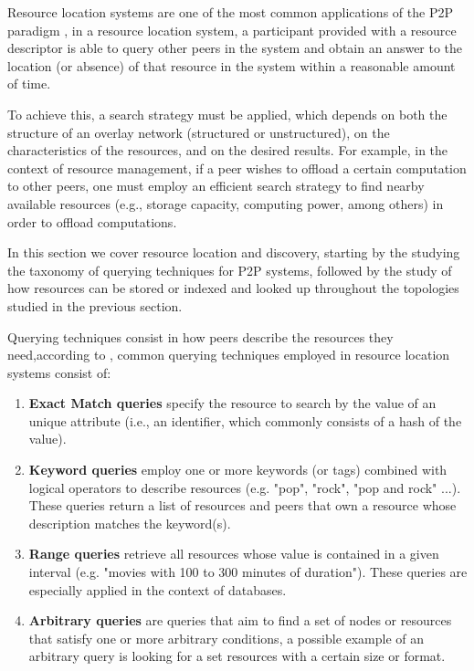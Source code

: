 

Resource location systems are one of the most common applications of the P2P paradigm \cite{leitaoPHDthesis}, in a resource location system, a participant provided with a resource descriptor is able to query other peers in the system and obtain an answer to the location (or absence) of that resource in the system within a reasonable amount of time.

To achieve this, a search strategy must be applied, which depends on both the structure of an overlay network (structured or unstructured), on the characteristics of the resources, and on the desired results. For example, in the context of resource management, if a peer wishes to offload a certain computation to other peers, one must employ an efficient search strategy to find nearby available resources (e.g., storage capacity, computing power, among others) in order to offload computations.

In this section we cover resource location and discovery, starting by the studying the taxonomy of querying techniques for P2P systems, followed by the study of how resources can be stored or indexed and looked up throughout the topologies studied in the previous section.

Querying techniques consist in how peers describe the resources they need,according to \cite{leitaoPHDthesis}, common querying techniques employed in resource location systems consist of:

\begin{enumerate}
    \item \textbf{Exact Match queries} specify the resource to search by the value of an unique attribute (i.e., an identifier, which commonly consists of a hash of the value).

    \item \textbf{Keyword queries} employ one or more keywords (or tags) combined with logical operators to describe resources (e.g. "pop", "rock", "pop and rock" ...). These queries return a list of resources and peers that own a resource whose description matches the keyword(s).
    
    \item \textbf{Range queries} retrieve all resources whose value is contained in a given interval (e.g. "movies with 100 to 300 minutes of duration"). These queries are especially applied in the context of databases.
    
    \item \textbf{Arbitrary queries} are queries that aim to find a set of nodes or resources that satisfy one or more arbitrary conditions, a possible example of an arbitrary query is looking for a set resources with a certain size or format.
    
\end{enumerate}

